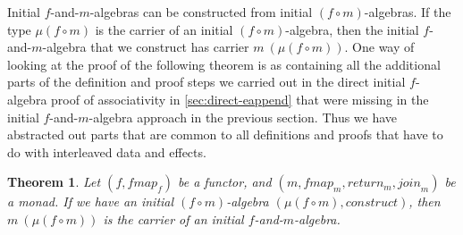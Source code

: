 \documentclass{jfp1}
\newtheorem{theorem}{Theorem}
\begin{document}
Initial $f$-and-$m$-algebras can be constructed from initial $(f \circ
m)$-algebras. If the type $\mu(f \circ m)$ is the carrier of an
initial $(f \circ m)$-algebra, then the initial $f$-and-$m$-algebra
that we construct has carrier $m~(\mu (f \circ m))$. One way of
looking at the proof of the following theorem is as containing all the
additional parts of the definition and proof steps we carried out in
the direct initial $f$-algebra proof of associativity in
\autoref{sec:direct-eappend} that were missing in the initial
$f$-and-$m$-algebra approach in the previous section. Thus we have
abstracted out parts that are common to all definitions and proofs
that have to do with interleaved data and effects.

\begin{theorem}\label{thm:make-initial-f-and-m-alg}
  Let $(f, \mathit{fmap}_f)$ be a functor, and $(m, \mathit{fmap}_m,
  \mathit{return}_m, \mathit{join}_m)$ be a monad.  If we have an
  initial $(f \circ m)$-algebra $(\mu(f \circ m),
  \mathit{construct})$, then $m~(\mu(f \circ m))$ is the carrier of an
  initial $f$-and-$m$-algebra.
\end{theorem}
\end{document}
